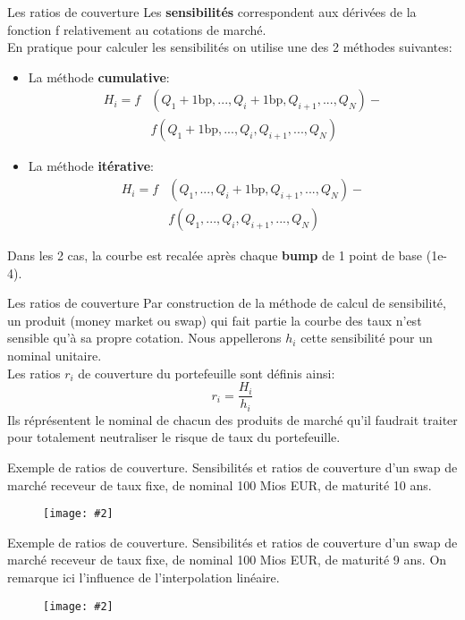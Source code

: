 \documentclass{beamer}
\newcommand{\FIG}[2]{\texttt{[image: \#2]}}
\begin{document}
\begin{frame}{Les ratios de couverture }
Les \textbf{sensibilités} correspondent aux dérivées de la fonction f relativement au cotations de marché.\\
En pratique pour calculer les sensibilités on utilise une des 2 méthodes suivantes:
\begin{itemize}
\item La méthode \textbf{cumulative}:
\[
\begin{split}
H_i=f&(Q_1+1\text{bp},...,Q_i+1\text{bp},Q_{i+1},...,Q_{N})-\\
&f(Q_1+1\text{bp},...,Q_i,Q_{i+1},...,Q_{N})
\end{split}
\]
\item La méthode \textbf{itérative}:
\[
\begin{split}
H_i=f&(Q_1,...,Q_i+1\text{bp},Q_{i+1},...,Q_{N})-\\
&f(Q_1,...,Q_i,Q_{i+1},...,Q_{N})
\end{split}
\]
\end{itemize}
Dans les 2 cas, la courbe est recalée après chaque \textbf{bump} de 1 point de base (1e-4).
\end{frame}

\begin{frame}{Les ratios de couverture}
Par construction de la méthode de calcul de sensibilité, un produit (money market ou swap) qui fait partie la courbe des taux n'est sensible qu'à sa propre cotation. Nous appellerons $h_i$ cette sensibilité pour un nominal unitaire.\\
\vspace{0.5cm}
Les ratios $r_i$ de couverture du portefeuille sont définis ainsi:
\[
r_i=\frac{H_i}{h_i}
\]
Ils réprésentent le nominal de chacun des produits de marché qu'il faudrait traiter pour totalement neutraliser le risque de taux du portefeuille.
\end{frame}

\begin{frame}{Exemple de ratios de couverture.}
Sensibilités et ratios de couverture d'un swap de marché receveur de taux fixe, de nominal 100 Mios EUR, de maturité 10 ans.
\begin{figure}[h]
\FIG{10cm}{figures/hedgeratio1.png}
\end{figure}
\end{frame}

\begin{frame}{Exemple de ratios de couverture.}
Sensibilités et ratios de couverture d'un swap de marché receveur de taux fixe, de nominal 100 Mios EUR, de maturité 9 ans. On remarque ici l'influence de l'interpolation linéaire.
\begin{figure}[h]
\FIG{10cm}{figures/hedgeratio2.png}
\end{figure}
\end{frame}
\end{document}

